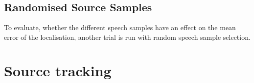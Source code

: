 \subsection*{Randomised Source Samples}
To evaluate, whether the different speech samples have an effect on the mean error of the localisation, another trial is run with random speech sample selection.








\section{Source tracking}